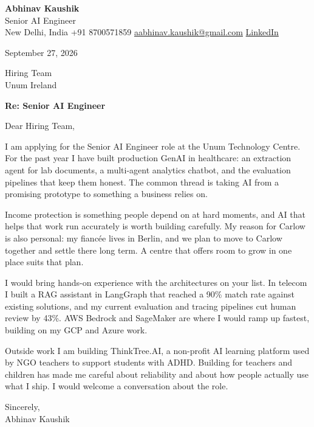 \documentclass[11pt,a4paper]{article}
\begin{document}
{\Large\bfseries Abhinav Kaushik}\\
Senior AI Engineer\\
New Delhi, India \textbar{} +91 8700571859 \textbar{} \href{mailto:aabhinav.kaushik@gmail.com}{aabhinav.kaushik@gmail.com} \textbar{} \href{https://www.linkedin.com/in/abhinav-kaushik10/}{LinkedIn}  

September 27, 2026

Hiring Team\\
Unum Ireland

\textbf{Re: Senior AI Engineer}

Dear Hiring Team,

I am applying for the Senior AI Engineer role at the Unum Technology Centre. For the past year I have built production GenAI in healthcare: an extraction agent for lab documents, a multi-agent analytics chatbot, and the evaluation pipelines that keep them honest. The common thread is taking AI from a promising prototype to something a business relies on.

Income protection is something people depend on at hard moments, and AI that helps that work run accurately is worth building carefully. My reason for Carlow is also personal: my fiancée lives in Berlin, and we plan to move to Carlow together and settle there long term. A centre that offers room to grow in one place suits that plan.

I would bring hands-on experience with the architectures on your list. In telecom I built a RAG assistant in LangGraph that reached a 90\% match rate against existing solutions, and my current evaluation and tracing pipelines cut human review by 43\%. AWS Bedrock and SageMaker are where I would ramp up fastest, building on my GCP and Azure work.

Outside work I am building ThinkTree.AI, a non-profit AI learning platform used by NGO teachers to support students with ADHD. Building for teachers and children has made me careful about reliability and about how people actually use what I ship. I would welcome a conversation about the role.

Sincerely,\\[4pt]
Abhinav Kaushik
\end{document}
